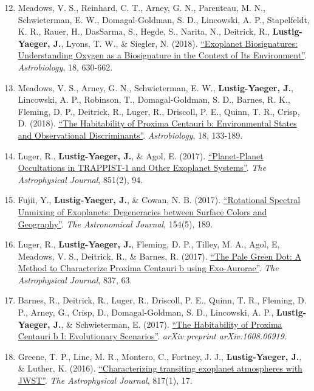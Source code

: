 \documentclass[margin,10pt]{res}
\newenvironment{benumerate}[1]{
    \let\oldItem\item
    \def\item{\addtocounter{enumi}{-2}\oldItem}
    \begin{enumerate}
    \setcounter{enumi}{#1}
    \addtocounter{enumi}{1}
}{
    \end{enumerate}
}
\begin{document}
\begin{resume}
\begin{benumerate}{11}
                    \item Meadows, V. S.,  Reinhard, C. T., Arney, G. N., Parenteau, M. N., Schwieterman, E. W., Domagal-Goldman, S. D., Lincowski, A. P., Stapelfeldt, K. R., Rauer, H., DasSarma, S., Hegde, S., Narita, N., Deitrick, R., \textbf{Lustig-Yaeger, J.}, Lyons, T. W., \& Siegler, N. (2018).  \href{http://adsabs.harvard.edu/abs/2018AsBio..18..630M}{``Exoplanet Biosignatures:  Understanding Oxygen as a Biosignature in the Context of Its Environment''}. \textit{Astrobiology}, 18, 630-662.
                    \item Meadows, V. S., Arney, G. N., Schwieterman, E. W., \textbf{Lustig-Yaeger, J.}, Lincowski, A. P., Robinson, T.,  Domagal-Goldman, S. D., Barnes, R. K., Fleming, D. P., Deitrick, R., Luger, R., Driscoll, P. E., Quinn, T. R., Crisp, D. (2018). \href{http://adsabs.harvard.edu/abs/2018AsBio..18..133M}{``The Habitability of Proxima Centauri b: Environmental States and Observational Discriminants''}. \textit{Astrobiology}, 18, 133-189.
                    \item Luger, R., \textbf{Lustig-Yaeger, J.}, \& Agol, E. (2017).  \href{http://adsabs.harvard.edu/abs/2017ApJ...851...94L}{``Planet-Planet Occultations in TRAPPIST-1 and Other Exoplanet Systems''}. \textit{The Astrophysical Journal}, 851(2), 94.
                    \item Fujii, Y., \textbf{Lustig-Yaeger, J.}, \& Cowan, N. B. (2017). \href{http://adsabs.harvard.edu/abs/2017arXiv170804886F}{``Rotational Spectral Unmixing of Exoplanets: Degeneracies between Surface Colors and Geography''}. \textit{The Astronomical Journal}, 154(5), 189.
                    \item Luger, R., \textbf{Lustig-Yaeger, J.}, Fleming, D. P., Tilley, M. A., Agol, E, Meadows, V. S., Deitrick, R., \& Barnes, R. (2017). \href{http://adsabs.harvard.edu/abs/2017ApJ...837...63L}{``The Pale Green Dot: A Method to Characterize Proxima Centauri b using Exo-Aurorae''}. \textit{The Astrophysical Journal}, 837, 63.
                    \item Barnes, R., Deitrick, R., Luger, R., Driscoll, P. E., Quinn, T. R., Fleming, D. P., Arney, G., Crisp, D., Domagal-Goldman, S. D., Lincowski, A. P., \textbf{Lustig-Yaeger, J.}, \& Schwieterman, E. (2017). \href{http://adsabs.harvard.edu/cgi-bin/bib_query?arXiv:1608.06919}{``The Habitability of Proxima Centauri b I: Evolutionary Scenarios''}. \textit{arXiv preprint arXiv:1608.06919.}
                    \item Greene, T. P., Line, M. R., Montero, C., Fortney, J. J., \textbf{Lustig-Yaeger, J.}, \& Luther, K. (2016). \href{http://adsabs.harvard.edu/abs/2016ApJ...817...17G}{``Characterizing transiting exoplanet atmospheres with JWST''}. \textit{The Astrophysical Journal}, 817(1), 17.

\end{benumerate}
\end{resume}
\end{document}
